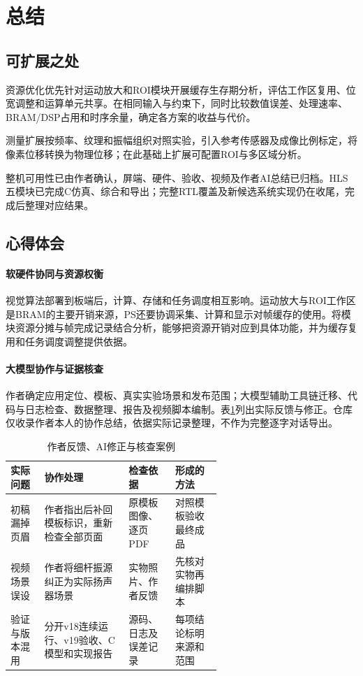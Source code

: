 \section{总结}
\label{sec:conclusion}

\subsection{可扩展之处}
资源优化优先针对运动放大和ROI模块开展缓存生存期分析，评估工作区复用、位宽调整和运算单元共享。在相同输入与约束下，同时比较数值误差、处理速率、BRAM/DSP占用和时序余量，确定各方案的收益与代价。

测量扩展按频率、纹理和振幅组织对照实验，引入参考传感器及成像比例标定，将像素位移转换为物理位移；在此基础上扩展可配置ROI与多区域分析。

整机可用性已由作者确认，屏端、硬件、验收、视频及作者AI总结已归档。HLS五模块已完成C仿真、综合和导出；完整RTL覆盖及新候选系统实现仍在收尾，完成后整理对应结果。

\subsection{心得体会}
\paragraph{软硬件协同与资源权衡}
视觉算法部署到板端后，计算、存储和任务调度相互影响。运动放大与ROI工作区是BRAM的主要开销来源，PS还要协调采集、计算和显示对帧缓存的使用。将模块资源分摊与帧完成记录结合分析，能够把资源开销对应到具体功能，并为缓存复用和任务调度调整提供依据。

\paragraph{大模型协作与证据核查}
作者确定应用定位、模板、真实实验场景和发布范围；大模型辅助工具链迁移、代码与日志检查、数据整理、报告及视频脚本编制。表\ref{tab:collaboration}列出实际反馈与修正。仓库仅收录作者本人的协作总结，依据实际记录整理，不作为完整逐字对话导出。

\begin{table}[htbp]
  \centering\small
  \caption{作者反馈、AI修正与核查案例}
  \label{tab:collaboration}
  \begin{tabularx}{\linewidth}{@{}p{0.16\linewidth}Xp{0.22\linewidth}p{0.22\linewidth}@{}}
    \toprule
    实际问题 & 协作处理 & 检查依据 & 形成的方法 \\
    \midrule
    初稿漏掉页眉 & 作者指出后补回模板标识，重新检查全部页面 & 原模板图像、逐页PDF & 对照模板验收最终成品 \\
    视频场景误设 & 作者将细杆振源纠正为实际扬声器场景 & 实物照片、作者反馈 & 先核对实物再编排脚本 \\
    验证与版本混用 & 分开v18连续运行、v19验收、C模型和实现报告 & 源码、日志及误差记录 & 每项结论标明来源和范围 \\
    \bottomrule
  \end{tabularx}
\end{table}


